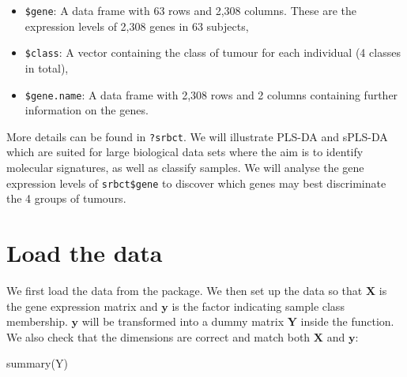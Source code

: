 \documentclass[
]{book}
\newenvironment{Shaded}{\begin{snugshade}}{\end{snugshade}}
\newcommand{\CommentTok}[1]{\textcolor[rgb]{0.56,0.35,0.01}{\textit{#1}}}
\newcommand{\FunctionTok}[1]{\textcolor[rgb]{0.00,0.00,0.00}{#1}}
\newcommand{\NormalTok}[1]{#1}
\newcommand{\OtherTok}[1]{\textcolor[rgb]{0.56,0.35,0.01}{#1}}
\newcommand{\SpecialCharTok}[1]{\textcolor[rgb]{0.00,0.00,0.00}{#1}}
\begin{document}
\begin{itemize}
\item
  \texttt{\$gene}: A data frame with 63 rows and 2,308 columns. These are the expression levels of 2,308 genes in 63 subjects,
\item
  \texttt{\$class}: A vector containing the class of tumour for each individual (4 classes in total),
\item
  \texttt{\$gene.name}: A data frame with 2,308 rows and 2 columns containing further information on the genes.
\end{itemize}

More details can be found in \texttt{?srbct}. We will illustrate PLS-DA and sPLS-DA which are suited for large biological data sets where the aim is to identify molecular signatures, as well as classify samples. We will analyse the gene expression levels of \texttt{srbct\$gene} to discover which genes may best discriminate the 4 groups of tumours.

\hypertarget{plsda:load}{%
\section{Load the data}\label{plsda:load}}

We first load the data from the package. We then set up the data so that \(\boldsymbol X\) is the gene expression matrix and \(\boldsymbol y\) is the factor indicating sample class membership. \(\boldsymbol y\) will be transformed into a dummy matrix \(\boldsymbol Y\) inside the function. We also check that the dimensions are correct and match both \(\boldsymbol X\) and \(\boldsymbol y\):

\begin{Shaded}
\end{Shaded}

\begin{Shaded}
\begin{Highlighting}[]
\FunctionTok{summary}\NormalTok{(Y)}
\end{Highlighting}
\end{Shaded}
\end{document}
